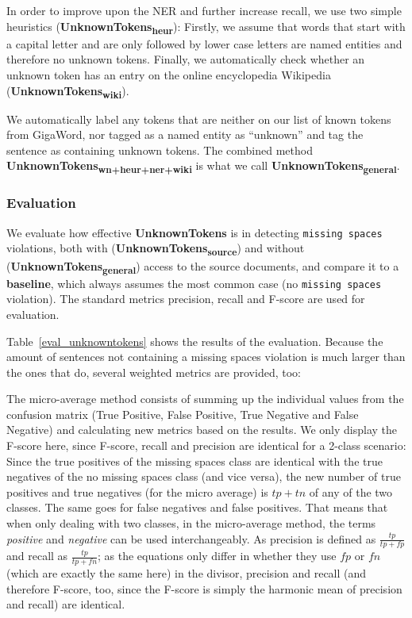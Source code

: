 \documentclass[a4paper,10pt]{scrartcl}
\theoremstyle{style}
\newcommand{\comment}[1]{
\todo[bordercolor=todoorange!80!black,color=todoorange]{\textbf{Comment:} #1}
}
\begin{document}
In order to improve upon the NER and further increase recall, we use two simple heuristics (\textbf{UnknownTokens\textsubscript{heur}}): Firstly, we assume that words that start with a capital letter and are only followed by lower case letters are named entities and therefore no unknown tokens. Finally, we automatically check whether an unknown token has an entry on the online encyclopedia Wikipedia (\textbf{UnknownTokens\textsubscript{wiki}}).

We automatically label any tokens that are neither on our list of known tokens from GigaWord, nor tagged as a named entity as ``unknown'' and tag the sentence as containing unknown tokens. The combined method \textbf{UnknownTokens\textsubscript{wn+heur+ner+wiki}} is what we call \textbf{UnknownTokens\textsubscript{general}}.

\subsubsection{Evaluation}
We evaluate how effective \textbf{UnknownTokens} is in detecting \texttt{missing spaces} violations, both with (\textbf{UnknownTokens\textsubscript{source}}) and without (\textbf{UnknownTokens\textsubscript{general}}) access to the source documents, and compare it to a \textbf{baseline}, which always assumes the most common case (no \texttt{missing spaces} violation).
The standard metrics precision, recall and F-score are used for evaluation.

Table~\ref{eval_unknowntokens} shows the results of the evaluation. %
Because the amount of sentences not containing a missing spaces violation is much larger than the ones that do, several weighted metrics are provided, too:

The micro-average method consists of summing up the individual values from the confusion matrix (True Positive, False Positive, True Negative and False Negative) and calculating new metrics based on the results. We only display the F-score here, since F-score, recall and precision are identical for a 2-class scenario: Since the true positives of the missing spaces class are identical with the true negatives of the no missing spaces class (and vice versa), the new number of true positives and true negatives (for the micro average) is $tp + tn$ of any of the two classes. The same goes for false negatives and false positives. That means that when only dealing with two classes, in the micro-average method, the terms \textit{positive} and \textit{negative} can be used interchangeably. As precision is defined as $\frac{tp}{tp+fp}$ and recall as $\frac{tp}{tp+fn}$; as the equations only differ in whether they use $fp$ or $fn$ (which are exactly the same here) in the divisor, precision and recall (and therefore F-score, too, since the F-score is simply the harmonic mean of precision and recall) are identical.
\end{document}
